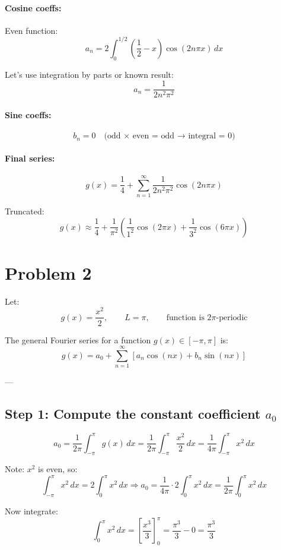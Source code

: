 \documentclass{article}
\begin{document}
\paragraph{Cosine coeffs:}
Even function:
\[
a_n = 2 \int_0^{1/2} \left( \frac{1}{2} - x \right) \cos(2n\pi x)\,dx
\]

Let’s use integration by parts or known result:
\[
a_n = \frac{1}{2n^2\pi^2}
\]

\paragraph{Sine coeffs:}
\[
b_n = 0 \quad \text{(odd × even = odd → integral = 0)}
\]

\paragraph{Final series:}
\[
g(x) = \frac{1}{4} + \sum_{n=1}^\infty \frac{1}{2n^2\pi^2} \cos(2n\pi x)
\]

Truncated:
\[
g(x) \approx \frac{1}{4} + \frac{1}{\pi^2} \left( \frac{1}{1^2} \cos(2\pi x) + \frac{1}{3^2} \cos(6\pi x) \right)
\]

\newpage
\section*{Problem 2}

Let:
\[
g(x) = \frac{x^2}{2}, \qquad L = \pi, \qquad \text{function is } 2\pi\text{-periodic}
\]

The general Fourier series for a function \( g(x) \in [-\pi, \pi] \) is:
\[
g(x) = a_0 + \sum_{n=1}^{\infty} \left[ a_n \cos(nx) + b_n \sin(nx) \right]
\]

---

\subsection*{Step 1: Compute the constant coefficient \( a_0 \)}

\[
a_0 = \frac{1}{2\pi} \int_{-\pi}^{\pi} g(x) \, dx = \frac{1}{2\pi} \int_{-\pi}^{\pi} \frac{x^2}{2} \, dx = \frac{1}{4\pi} \int_{-\pi}^{\pi} x^2 \, dx
\]

Note: \( x^2 \) is even, so:
\[
\int_{-\pi}^{\pi} x^2 \, dx = 2 \int_0^{\pi} x^2 \, dx
\Rightarrow a_0 = \frac{1}{4\pi} \cdot 2 \int_0^{\pi} x^2 \, dx = \frac{1}{2\pi} \int_0^{\pi} x^2 \, dx
\]

Now integrate:
\[
\int_0^{\pi} x^2 \, dx = \left[ \frac{x^3}{3} \right]_0^{\pi} = \frac{\pi^3}{3} - 0 = \frac{\pi^3}{3}
\]
\end{document}
